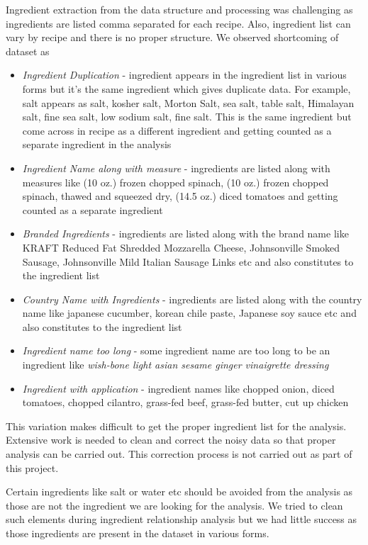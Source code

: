 \documentclass[sigconf]{acmart}
\begin{document}
Ingredient extraction from the data structure and processing was challenging as ingredients are listed comma separated for each recipe. Also, ingredient list can vary by recipe and there is no proper structure. We observed shortcoming of dataset as
\begin{itemize}
\item \emph{Ingredient Duplication} - ingredient appears in the ingredient list in  various forms but it's the same ingredient which gives duplicate data. For example, salt appears as salt, kosher salt, Morton Salt, sea salt, table salt, Himalayan salt, fine sea salt, low sodium salt, fine salt. This is the same ingredient but come across in recipe as a different ingredient and getting counted as a separate ingredient in the analysis
\item \emph{Ingredient Name along with measure} - ingredients are listed along with measures like (10 oz.) frozen chopped spinach, (10 oz.) frozen chopped spinach, thawed and squeezed dry, (14.5 oz.) diced tomatoes and getting counted as a separate ingredient
\item \emph{Branded Ingredients} - ingredients are listed along with the brand name like KRAFT Reduced Fat Shredded Mozzarella Cheese, Johnsonville Smoked Sausage, Johnsonville Mild Italian Sausage Links etc and also constitutes to the ingredient list
\item \emph{Country Name with Ingredients} - ingredients are listed along with the country name like japanese cucumber, korean chile paste, Japanese soy sauce etc and also constitutes to the ingredient list
\item \emph{Ingredient name too long} - some ingredient name are too long to be an ingredient like \emph{wish-bone light asian sesame ginger vinaigrette dressing}
\item \emph{Ingredient with application} - ingredient names like chopped onion, diced tomatoes, chopped cilantro, grass-fed beef, grass-fed butter, cut up chicken
\end{itemize}

This variation makes difficult to get the proper ingredient list for the analysis. Extensive work is needed to clean and correct the noisy data so that proper analysis can be carried out. This correction process is not carried out as part of this project.

Certain ingredients like salt or water etc should be avoided from the analysis as those are not the ingredient we are looking for the analysis. We tried to clean such elements during ingredient relationship analysis but we had little success as those ingredients are present in the dataset in various forms.  
\end{document}
